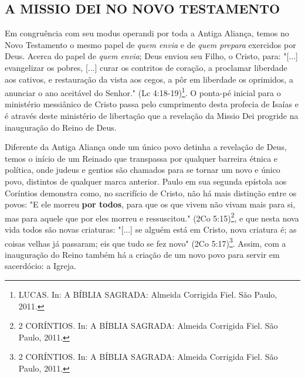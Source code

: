 \documentclass[
    article,            %
	12pt,				%
	oneside,			%
	a4paper,			%
	chapter=TITLE,		%
	section=TITLE,		%
	english,			%
	french,				%
	spanish,			%
	brazil				%
	]{abntex2}
\begin{document}
\subsection{A MISSIO DEI NO NOVO TESTAMENTO}
Em congruência com seu modus operandi por toda a Antiga Aliança, temos no Novo Testamento o mesmo papel de \emph{quem envia} e de \emph{quem prepara} exercidos por Deus. Acerca do papel de \emph{quem envia}; Deus enviou seu Filho, o Cristo, para: "[...] evangelizar os pobres, [...] curar os contritos de coração, a proclamar liberdade aos cativos, e restauração da vista aos cegos, a pôr em liberdade os oprimidos, a anunciar o ano aceitável do Senhor." (Lc 4:18-19)\footnote{LUCAS. In: A BÍBLIA SAGRADA: Almeida Corrigida Fiel. São Paulo, 2011.}. O ponta-pé inicial para o ministério messiânico de Cristo passa pelo cumprimento desta profecia de Isaías e é através deste ministério de libertação que a revelação da Missio Dei progride na inauguração do Reino de Deus.

Diferente da Antiga Aliança onde um único povo detinha a revelação de Deus, temos o início de um Reinado que transpassa por qualquer barreira étnica e política, onde judeus e gentios são chamados para se tornar um novo e único povo, distintos de qualquer marca anterior. Paulo em sua segunda epístola aos Coríntios demonstra como, no sacrifício de Cristo, não há mais distinção entre os povos: "E ele morreu \textbf{por todos}, para que os que vivem não vivam mais para si, mas para aquele que por eles morreu e ressuscitou." (2Co 5:15)\footnote{2 CORÍNTIOS. In: A BÍBLIA SAGRADA: Almeida Corrigida Fiel. São Paulo, 2011.}, e que nesta nova vida todos são novas criaturas: "[...] se alguém está em Cristo, nova criatura é; as coisas velhas já passaram; eis que tudo se fez novo" (2Co 5:17)\footnote{2 CORÍNTIOS. In: A BÍBLIA SAGRADA: Almeida Corrigida Fiel. São Paulo, 2011.}. Assim, com a inauguração do Reino também há a criação de um novo povo para servir em sacerdócio: a Igreja.
\end{document}
